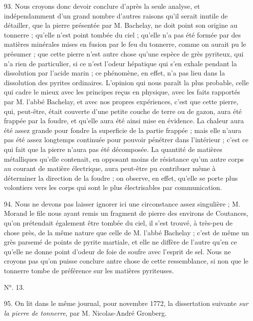 \documentclass[a4paper, 11pt, oneside, polutonikogreek, french]{article}
\begin{document}
93. Nous croyons donc devoir conclure d'après la seule analyse, et indépendamment d'un grand nombre d'autres raisons qu'il serait inutile de détailler, que la pierre présentée par M. Bachelay, ne doit point son origine au tonnerre ; qu'elle n'est point tombée du ciel ; qu'elle n'a pas été formée par des matières minérales mises en fusion par le feu du tonnerre, comme on aurait pu le présumer ; que cette pierre n'est autre chose qu'une espèce de grès pyriteux, qui n'a rien de particulier, si ce n'est l'odeur hépatique qui s'en exhale pendant la dissolution par l'acide marin ; ce phénomène, en effet, n'a pas lieu dans la dissolution des pyrites ordinaires. L'opinion qui nous paraît la plus probable, celle qui cadre le mieux avec les principes reçus en physique, avec les faits rapportés par M. l'abbé Bachelay, et avec nos propres expériences, c'est que cette pierre, qui, peut-être, était couverte d'une petite couche de terre ou de gazon, aura été frappée par la foudre, et qu'elle aura été ainsi mise en évidence. La chaleur aura été assez grande pour fondre la superficie de la partie frappée ; mais elle n'aura pas été assez longtemps continuée pour pouvoir pénétrer dans l'intérieur ; c'est ce qui fait que la pierre n'aura pas été décomposée. La quantité de matières métalliques qu'elle contenait, en opposant moins de résistance qu'un autre corps au courant de matière électrique, aura peut-être pu contribuer même à déterminer la direction de la foudre ; on observe, en effet, qu'elle se porte plus volontiers vers les corps qui sont le plus électrisables par communication.

94. Nous ne devons pas laisser ignorer ici une circonstance assez singulière ; M. Morand le file nous ayant remis un fragment de pierre des environs de Coutances, qu'on prétendait également être tombée du ciel, il s'est trouvé, à très-peu de chose près, de la même nature que celle de M. l'abbé Bachelay ; c'est de même un grès parsemé de points de pyrite martiale, et elle ne diffère de l'autre qu'en ce qu'elle ne donne point d'odeur de foie de soufre avec l'esprit de sel. Nous ne croyons pas qu'on puisse conclure antre chose de cette ressemblance, si non que le tonnerre tombe de préférence sur les matières pyriteuses.

\begin{center}
N°. 13.
\end{center}

95. On lit dans le même journal, pour novembre 1772, la dissertation suivante \emph{sur la pierre de tonnerre}, par M. Nicolas-André Gronberg.
\end{document}
